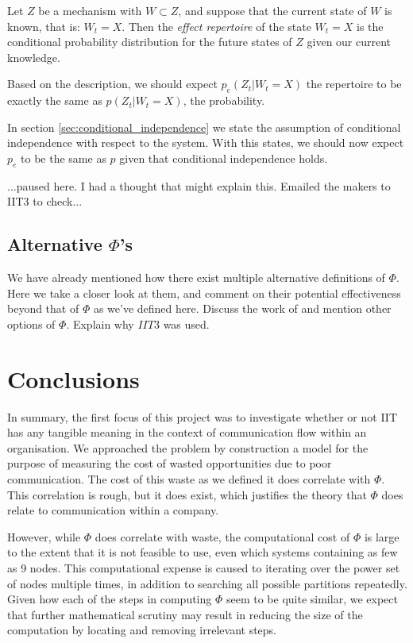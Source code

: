 \begin{definition}
Let $Z$ be a mechanism with $W\subset Z$, and suppose that the current state of $W$ is known, that is: $W_t = X$. Then the \textit{effect repertoire} of the state $W_t = X$ is the conditional probability distribution for the future states of $Z$ given our current knowledge.
\end{definition}

Based on the description, we should expect $p_e(Z_t|W_t = X)$ the repertoire to be exactly the same as $p(Z_t|W_t = X)$, the probability. 

In section \ref{sec:conditional_independence} we state the assumption of conditional independence with respect to the system. With this states, we should now expect $p_e$ to be the same as $p$ given that conditional independence holds.

...paused here. I had a thought that might explain this. Emailed the makers to IIT3 to check...


\subsection{Alternative $\Phi$'s}
We have already mentioned how there exist multiple alternative definitions of $\Phi$. Here we take a closer look at them, and comment on their potential effectiveness beyond that of $\Phi$ as we've defined here.
Discuss the work of \cite{tegmark2016improved} and mention other options of $\Phi$. Explain why $IIT3$ was used.

\section{Conclusions}
In summary, the first focus of this project was to investigate whether or not IIT has any tangible meaning in the context of communication flow within an organisation. We approached the problem by construction a model for the purpose of measuring the cost of wasted opportunities due to poor communication. The cost of this waste as we defined it does correlate with $\Phi$. This correlation is rough, but it does exist, which justifies the theory that $\Phi$ does relate to communication within a company. 

However, while $\Phi$ does correlate with waste, the computational cost of $\Phi$ is large to the extent that it is not feasible to use, even which systems containing as few as 9 nodes. This computational expense is caused to iterating over the power set of nodes multiple times, in addition to searching all possible partitions repeatedly. Given how each of the steps in computing $\Phi$ seem to be quite similar, we expect that further mathematical scrutiny may result in reducing the size of the computation by locating and removing irrelevant steps. 

